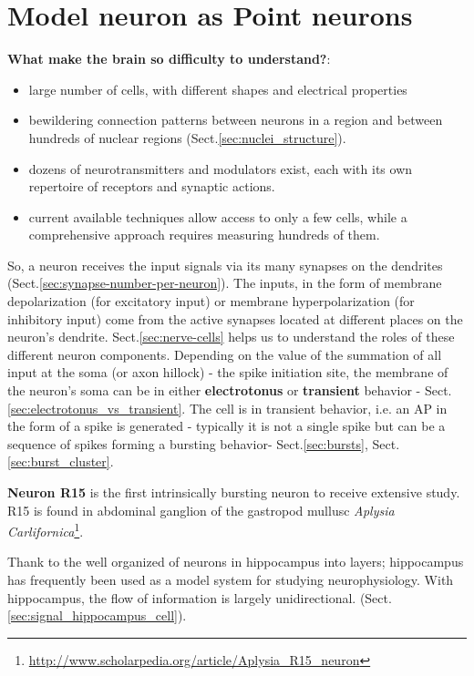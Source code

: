 \chapter{Model neuron as Point neurons}
\label{chap:point-neuron}

{\bf What make the brain so difficulty to understand?}:
\begin{itemize}
\item large number of cells, with different shapes and electrical
  properties
   
\item bewildering connection patterns between neurons in a region and between
hundreds of nuclear regions (Sect.\ref{sec:nuclei_structure}).

\item dozens of neurotransmitters and modulators exist, each with its
  own repertoire of receptors and synaptic actions.
  
   
\item current available techniques allow access to only a few cells,
  while a comprehensive approach requires measuring hundreds of them.
\end{itemize}

So, a neuron receives the input signals via its many synapses on the dendrites
(Sect.\ref{sec:synapse-number-per-neuron}). The inputs, in the form of membrane
depolarization (for excitatory input) or membrane hyperpolarization (for
inhibitory input) come from the active synapses located at different places on
the neuron's dendrite. Sect.\ref{sec:nerve-cells} helps us to understand the
roles of these different neuron components.
Depending on the value of the summation of all input at the soma (or axon
hillock) - the spike initiation site, the membrane of the neuron's soma can be
in either {\bf electrotonus} or {\bf transient} behavior -
Sect.\ref{sec:electrotonus_vs_transient}.
The cell is in transient behavior, i.e. an AP in the form of a spike is
generated - typically it is not a single spike but can be a sequence of spikes
forming a bursting behavior- Sect.\ref{sec:bursts},
Sect.\ref{sec:burst_cluster}.

\begin{mdframed}

{\bf Neuron R15} is the first intrinsically bursting neuron to receive
extensive study. R15 is found in abdominal ganglion of the gastropod mullusc {\it Aplysia
Carlifornica}\footnote{\url{http://www.scholarpedia.org/article/Aplysia_R15_neuron}}.

Thank to the well organized of neurons in hippocampus into
layers; hippocampus has frequently been used as a model system for studying
neurophysiology. With hippocampus, the flow of information is largely
unidirectional. (Sect.\ref{sec:signal_hippocampus_cell}).

\end{mdframed}  


